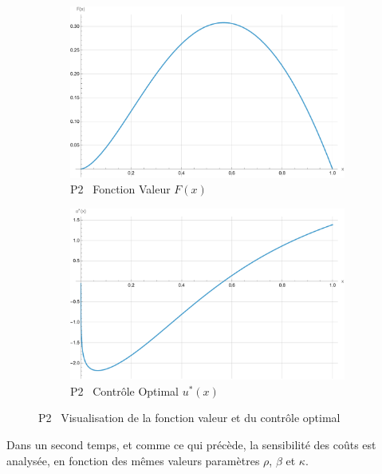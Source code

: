 \begin{figure}[htb]
    \centering
    \begin{subfigure}{0.45\linewidth}
        \includegraphics[width=\linewidth]{img/validation/P2/p2_value.pdf}
        \caption{P2 \textemdash~Fonction Valeur $F(x)$}\label{fig:ValueVisualisation2}
    \end{subfigure}
    \hfill
    \begin{subfigure}{0.45\linewidth}
        \includegraphics[width=\linewidth]{img/validation/P2/p2_control.pdf}
        \caption{P2 \textemdash~Contrôle Optimal $u^*(x)$}\label{fig:ControlVisualisation2}
    \end{subfigure}
    \caption{P2 \textemdash~Visualisation de la fonction valeur et du contrôle optimal}\label{fig:ValueControlComparison2}
\end{figure}\FloatBarrier Dans un second temps, et comme ce qui précède, la sensibilité des coûts est analysée, en fonction des mêmes valeurs paramètres $\rho$, $\beta$ et $\kappa$.
